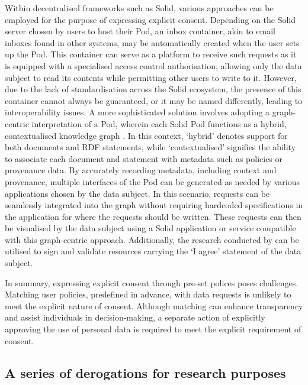 Within decentralised frameworks such as Solid, various approaches can be employed for the purpose of expressing explicit consent.
Depending on the Solid server chosen by users to host their Pod, an inbox container, akin to email inboxes found in other systems, may be automatically created when the user sets up the Pod.
This container can serve as a platform to receive such requests as it is equipped with a specialised access control authorisation, allowing only the data subject to read its contents while permitting other users to write to it. 
However, due to the lack of standardisation across the Solid ecosystem, the presence of this container cannot always be guaranteed, or it may be named differently, leading to interoperability issues.
A more sophisticated solution involves adopting a graph-centric interpretation of a Pod, wherein each Solid Pod functions as a hybrid, contextualised knowledge graph \citep{dedecker_whats_2022}.
In this context, `hybrid' denotes support for both documents and RDF statements, while `contextualised' signifies the ability to associate each document and statement with metadata such as policies or provenance data.
By accurately recording metadata, including context and provenance, multiple interfaces of the Pod can be generated as needed by various applications chosen by the data subject.
In this scenario, requests can be seamlessly integrated into the graph without requiring hardcoded specifications in the application for where the requests should be written.
These requests can then be visualised by the data subject using a Solid application or service compatible with this graph-centric approach.
Additionally, the research conducted by \cite{braun_selfverifying_2022} can be utilised to sign and validate resources carrying the `I agree' statement of the data subject.

In summary, expressing explicit consent through pre-set polices poses challenges.
Matching user policies, predefined in advance, with data requests is unlikely to meet the explicit nature of consent. 
Although matching can enhance transparency and assist individuals in decision-making, a separate action of explicitly approving the use of personal data is required to meet the explicit requirement of consent.

\subsection{A series of derogations for research purposes}
\label{sec:derogations}

